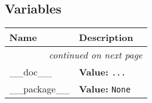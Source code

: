   \subsection{Variables}

    \vspace{-1cm}
\hspace{\varindent}\begin{longtable}{|p{\varnamewidth}|p{\vardescrwidth}|l}
\cline{1-2}
\cline{1-2} \centering \textbf{Name} & \centering \textbf{Description}& \\
\cline{1-2}
\endhead\cline{1-2}\multicolumn{3}{r}{\small\textit{continued on next page}}\\\endfoot\cline{1-2}
\endlastfoot\raggedright \_\-\_\-d\-o\-c\-\_\-\_\- & \raggedright \textbf{Value:} 
{\tt \texttt{...}}&\\
\cline{1-2}
\raggedright \_\-\_\-p\-a\-c\-k\-a\-g\-e\-\_\-\_\- & \raggedright \textbf{Value:} 
{\tt None}&\\
\cline{1-2}
\end{longtable}


